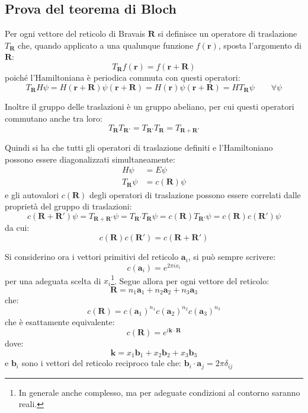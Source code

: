 \subsection{Prova del teorema di Bloch}

Per ogni vettore del reticolo di Bravais $ \textbf{R} $ si definisce un operatore di traslazione $ T_{\textbf{R}} $ che, quando applicato a una qualunque funzione $ f(\textbf{r}) $, sposta l'argomento di $ \textbf{R} $:
\[ T_{\textbf{R}} f(\textbf{r}) = f(\textbf{r} + \textbf{R}) \]
poiché l'Hamiltoniana è periodica commuta con questi operatori:
\[ T_{\textbf{R}} H \psi = H(\textbf{r} + \textbf{R})\psi(\textbf{r} + \textbf{R}) = H(\textbf{r})\psi(\textbf{r} + \textbf{R}) = H T_{\textbf{R}} \psi \qquad \forall \psi\]

Inoltre il gruppo delle traslazioni è un gruppo abeliano, per cui questi operatori commutano anche tra loro:
\[ T_{\textbf{R}}T_{\textbf{R}'} = T_{\textbf{R}'}T_{\textbf{R}} = T_{\textbf{R} + \textbf{R}'} \]

Quindi si ha che tutti gli operatori di traslazione definiti e l'Hamiltoniano possono essere diagonalizzati simultaneamente:
\begin{align*}
H\psi &= E\psi\\
T_{\textbf{R}}\psi &= c(\textbf{R})\psi
\end{align*}
e gli autovalori $ c(\textbf{R}) $ degli operatori di traslazione possono essere correlati dalle proprietà del gruppo di traslazioni:
\[ c(\textbf{R} + \textbf{R}')\psi = T_{\textbf{R} + \textbf{R}'}\psi = T_{\textbf{R}'}T_{\textbf{R}}\psi = c(\textbf{R})T_{\textbf{R}'}\psi = c(\textbf{R})c(\textbf{R}')\psi \]
da cui:
\[ c(\textbf{R})c(\textbf{R}') = c(\textbf{R} + \textbf{R}') \]

Si considerino ora i vettori primitivi del reticolo $ \textbf{a}_i $, si può sempre scrivere:
\[ c(\textbf{a}_i) = e^{2\pi i x_i} \]
per una adeguata scelta di $ x_i $\footnote{In generale anche complesso, ma per adeguate condizioni al contorno saranno reali.}. Segue allora per ogni vettore del reticolo:
\[ \textbf{R} = n_1 \textbf{a}_1 + n_2 \textbf{a}_2 + n_3 \textbf{a}_3 \]
che:
\[ c(\textbf{R}) = c(\textbf{a}_1)^{n_1} c(\textbf{a}_2)^{n_2} c(\textbf{a}_3)^{n_3}\]
che è esattamente equivalente:
\[ c(\textbf{R}) = e^{i\textbf{k}\cdot\textbf{R}} \]
dove:
\[ \textbf{k} = x_1 \textbf{b}_1 + x_2 \textbf{b}_2 + x_3 \textbf{b}_3 \]
e $ \textbf{b}_i $ sono i vettori del reticolo reciproco tale che: $ \textbf{b}_i \cdot \textbf{a}_j = 2\pi \delta_{ij} $

